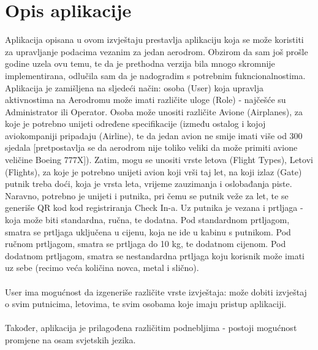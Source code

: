 \chapter{Opis aplikacije}

Aplikacija opisana u ovom izvještaju prestavlja aplikaciju koja se može koristiti za upravljanje podacima vezanim za jedan aerodrom. Obzirom da sam još prošle godine uzela ovu temu, te da je prethodna verzija bila mnogo skromnije implementirana, odlučila sam da je nadogradim s potrebnim fukncionalnostima. Aplikacija je zamišljena na sljedeći način: osoba (User) koja upravlja aktivnostima na Aerodromu može imati različite uloge (Role) - najčešće su Administrator ili Operator. Osoba može unositi različite Avione (Airplanes), za koje je potrebno unijeti određene specifikacije (između ostalog i kojoj aviokompaniji pripadaju (Airline), te da jedan avion ne smije imati više od 300 sjedala [pretpostavlja se da aerodrom nije toliko veliki da može primiti avione veličine Boeing 777X]). Zatim, mogu se unositi vrste letova (Flight Types), Letovi (Flights), za koje je potrebno unijeti avion koji vrši taj let, na koji izlaz (Gate) putnik treba doći, koja je vrsta leta, vrijeme zauzimanja i oslobađanja piste. Naravno, potrebno je unijeti i putnika, pri čemu se putnik veže za let, te se generiše QR kod kod registriranja Check In-a. Uz putnika je vezana i prtljaga - koja može biti standardna, ručna, te dodatna. Pod standardnom prtljagom, smatra se prtljaga uključena u cijenu, koja ne ide u kabinu s putnikom. Pod ručnom prtljagom, smatra se prtljaga do 10 kg, te dodatnom cijenom. Pod dodatnom prtljagom, smatra se nestandardna prtljaga koju korisnik može imati uz sebe (recimo veća količina novca, metal i slično). \\\\

User ima mogućnost da izgeneriše različite vrste izvještaja: može dobiti izvještaj o svim putnicima, letovima, te svim osobama koje imaju pristup aplikaciji.\\\\

Također, aplikacija je prilagođena različitim podnebljima - postoji mogućnost promjene na osam svjetskih jezika.